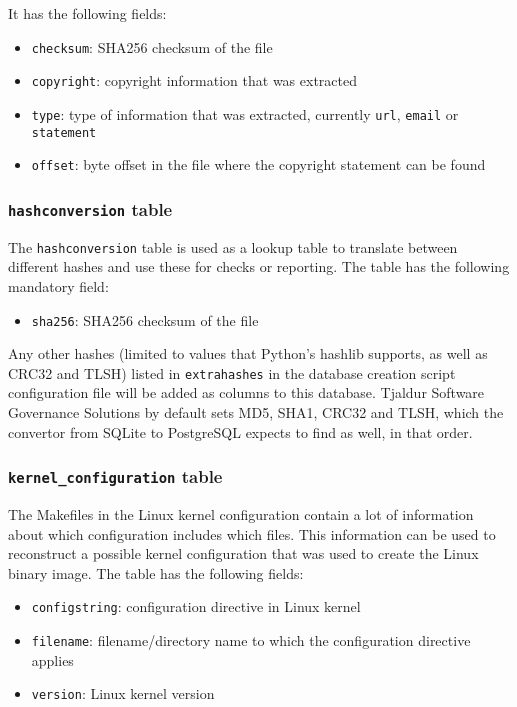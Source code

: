 \documentclass[10pt,a4paper]{article}
\begin{document}
It has the following fields:

\begin{itemize}
\item \texttt{checksum}: SHA256 checksum of the file
\item \texttt{copyright}: copyright information that was extracted
\item \texttt{type}: type of information that was extracted, currently
\texttt{url}, \texttt{email} or \texttt{statement}
\item \texttt{offset}: byte offset in the file where the copyright statement
can be found
\end{itemize}

\subsubsection{\texttt{hashconversion} table}

The \texttt{hashconversion} table is used as a lookup table to translate
between different hashes and use these for checks or reporting. The
table has the following mandatory field:

\begin{itemize}
\item \texttt{sha256}: SHA256 checksum of the file
\end{itemize}

Any other hashes (limited to values that Python's hashlib supports, as well as
CRC32 and TLSH) listed in \texttt{extrahashes} in the database creation script
configuration file will be added as columns to this database. Tjaldur Software
Governance Solutions by default sets MD5, SHA1, CRC32 and TLSH, which the
convertor from SQLite to PostgreSQL expects to find as well, in that order.

\subsubsection{\texttt{kernel\_configuration} table}

The Makefiles in the Linux kernel configuration contain a lot of information
about which configuration includes which files. This information can be used to
reconstruct a possible kernel configuration that was used to create the Linux
binary image. The table has the following fields:

\begin{itemize}
\item \texttt{configstring}: configuration directive in Linux kernel
\item \texttt{filename}: filename/directory name to which the configuration
directive applies
\item \texttt{version}: Linux kernel version
\end{itemize}
\end{document}
